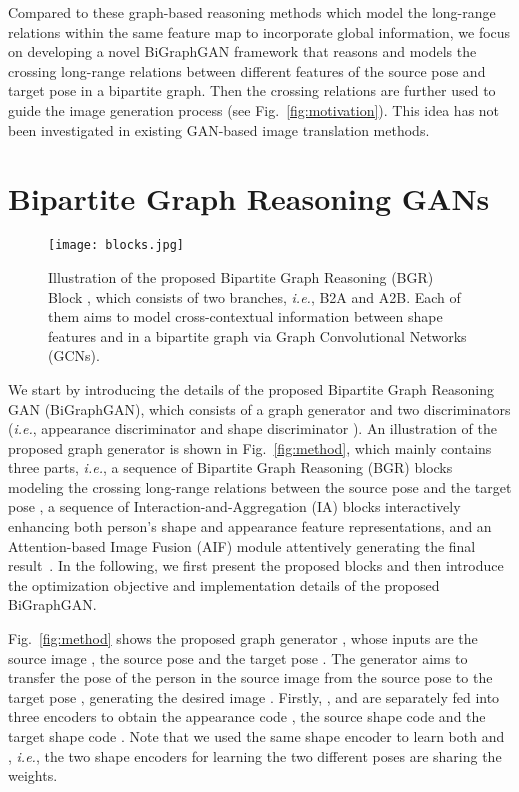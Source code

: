 \documentclass{bmvc2k}
\begin{document}
Compared to these graph-based reasoning methods which model the long-range relations within the same feature map to incorporate global information, we focus on developing a novel BiGraphGAN framework that reasons and models the crossing long-range relations between different features of the source pose and target pose in a bipartite graph.
Then the crossing relations are further used to guide the image generation process (see Fig.~\ref{fig:motivation}). 
This idea has not been investigated in existing GAN-based image translation methods.

 \section{Bipartite Graph Reasoning GANs}

\begin{figure}[!t]
	\centering
	\texttt{[image: blocks.jpg]}
	\caption{Illustration of the proposed Bipartite Graph Reasoning (BGR) Block , which consists of two branches, \emph{i.e.}, B2A and A2B. Each of them aims to model cross-contextual information between shape features  and  in a bipartite graph via Graph Convolutional Networks (GCNs).}
	\label{fig:blocks}
\end{figure}

We start by introducing the details of the proposed Bipartite Graph Reasoning GAN (BiGraphGAN), which consists of a graph generator  and two discriminators (\emph{i.e.}, appearance discriminator  and shape discriminator ).
An illustration of the proposed graph generator  is shown in Fig.~\ref{fig:method}, which mainly contains three parts, \emph{i.e.}, a sequence of Bipartite Graph Reasoning (BGR) blocks modeling the crossing long-range relations between the source pose  and the target pose , a sequence of Interaction-and-Aggregation (IA) blocks interactively enhancing both person's shape and appearance feature representations, and an Attention-based Image Fusion (AIF) module attentively generating the final result~.
In the following, we first present the proposed blocks and then introduce the optimization objective and implementation details of the proposed BiGraphGAN.

Fig.~\ref{fig:method} shows the proposed graph generator , whose inputs are the source image , the source pose  and the target pose .
The generator  aims to transfer the pose of the person in the source image  from the source pose  to the target pose , generating the desired image .
Firstly, ,  and  are separately fed into three encoders to obtain the appearance code , the source shape code  and the target shape code .
Note that we used the same shape encoder to learn both  and , \emph{i.e.}, the two shape encoders for learning the two different poses are sharing the weights.
\end{document}
